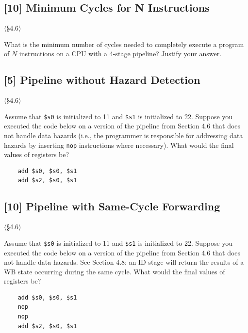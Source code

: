 \problembreak

\subsection{[10] Minimum Cycles for N Instructions}
\hypertarget{prob-4.17}{}
\noindent$\langle$\S4.6$\rangle$\medskip

\noindent What is the minimum number of cycles needed to completely execute a
program of $N$ instructions on a CPU with a 4-stage pipeline? Justify your
answer.

\problembreak

\subsection{[5] Pipeline without Hazard Detection}
\hypertarget{prob-4.18}{}
\noindent$\langle$\S4.6$\rangle$\medskip

\noindent Assume that \texttt{\$s0} is initialized to 11 and \texttt{\$s1} is
initialized to 22. Suppose you executed the code below on a version of the
pipeline from Section 4.6 that does not handle data hazards (i.e., the
programmer is responsible for addressing data hazards by inserting
\texttt{nop} instructions where necessary). What would the final values of
registers be?
\begin{verbatim}
    add $s0, $s0, $s1
    add $s2, $s0, $s1
\end{verbatim}

\problembreak

\subsection{[10] Pipeline with Same-Cycle Forwarding}
\hypertarget{prob-4.19}{}
\noindent$\langle$\S4.6$\rangle$\medskip

\noindent Assume that \texttt{\$s0} is initialized to 11 and \texttt{\$s1} is
initialized to 22. Suppose you executed the code below on a version of the
pipeline from Section 4.6 that does not handle data hazards. See
Section 4.8: an ID stage will return the results of a WB state occurring
during the same cycle. What would the final values of registers be?
\begin{verbatim}
    add $s0, $s0, $s1
    nop
    nop
    add $s2, $s0, $s1
\end{verbatim}

